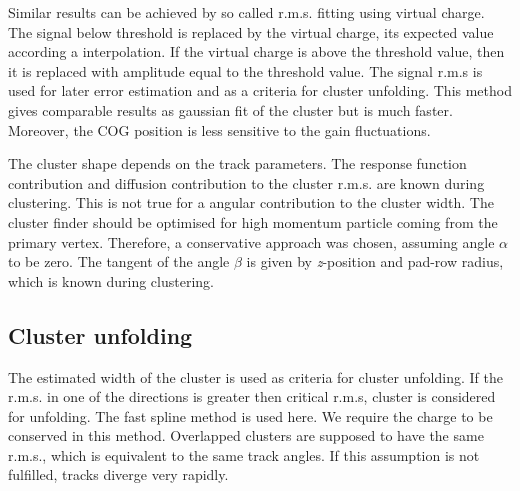 \documentclass[a4paper,12pt]{article}
\begin{document}
Similar results can be achieved  by so called r.m.s. fitting using
virtual charge. The signal below threshold is replaced by the
virtual charge, its expected value according a interpolation. If
the virtual charge is above the threshold value, then it is
replaced with amplitude equal to the threshold value. The signal
r.m.s is used for later error estimation  and as a criteria for
cluster unfolding. This method gives comparable results as
gaussian fit of the cluster but is much faster. Moreover, the COG
position is less sensitive to the gain fluctuations.

The cluster shape depends on the track parameters.  The response
function contribution and diffusion contribution to the cluster
r.m.s. are known during clustering. This is not true for a angular
contribution to the cluster width. The cluster finder should be
optimised for high momentum particle coming from the primary
vertex. Therefore, a conservative approach was chosen, assuming
angle $\alpha$ to be zero. The tangent of the angle $\beta$ is
given by  {\it{z}}-position and pad-row radius, which is known
during clustering.


\subsection{Cluster unfolding}

The estimated width of the cluster is used as criteria for cluster
unfolding. If the r.m.s. in one of the directions is greater then
critical r.m.s,  cluster is considered for unfolding. The fast
spline method is used here. We require the charge to be conserved
in this method. Overlapped clusters  are supposed to have the same
r.m.s., which is equivalent to the same track angles. If this
assumption is not fulfilled, tracks diverge very rapidly.
\end{document}
